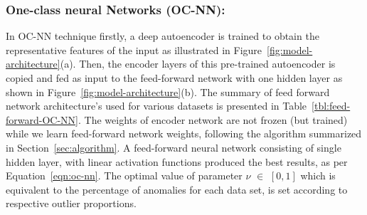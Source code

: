 {%
\subsubsection{ \textbf{One-class neural Networks (OC-NN):}}
\label{model_architecture}
In OC-NN technique firstly, a deep autoencoder is trained to obtain the representative features of the input as illustrated in Figure~\ref{fig:model-architecture}(a). Then, the encoder layers of this pre-trained autoencoder is copied and fed as input to the feed-forward network with one hidden layer as shown in Figure~\ref{fig:model-architecture}(b). The summary of feed forward network architecture's used for various datasets is presented in Table~\ref{tbl:feed-forward-OC-NN}. The weights of encoder network are not frozen (but trained) while we learn feed-forward network weights, following the algorithm summarized in Section~\ref{sec:algorithm}. A feed-forward neural network consisting of single hidden layer, with  linear activation functions produced the best results, as per Equation~\ref{eqn:oc-nn}.  The optimal value of parameter $\nu$ $\in$ ${[0, 1]}$ which is equivalent to the percentage of anomalies for each data set, is set according to respective outlier proportions.


}
